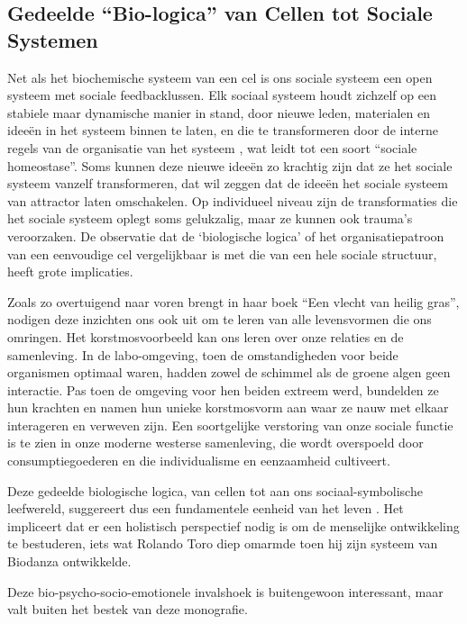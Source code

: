 \documentclass[
  11pt,
]{book}
\begin{document}
\hypertarget{gedeelde-bio-logica-van-cellen-tot-sociale-systemen}{%
\subsection{Gedeelde ``Bio-logica'' van Cellen tot Sociale Systemen}\label{gedeelde-bio-logica-van-cellen-tot-sociale-systemen}}

Net als het biochemische systeem van een cel is ons sociale systeem een open systeem met sociale feedbacklussen. Elk sociaal systeem houdt zichzelf op een stabiele maar dynamische manier in stand, door nieuwe leden, materialen en ideeën in het systeem binnen te laten, en die te transformeren door de interne regels van de organisatie van het systeem \citep{capraLuisi2014}, wat leidt tot een soort ``sociale homeostase''. Soms kunnen deze nieuwe ideeën zo krachtig zijn dat ze het sociale systeem vanzelf transformeren, dat wil zeggen dat de ideeën het sociale systeem van attractor laten omschakelen. Op individueel niveau zijn de transformaties die het sociale systeem oplegt soms gelukzalig, maar ze kunnen ook trauma's veroorzaken. De observatie dat de `biologische logica' of het organisatiepatroon van een eenvoudige cel vergelijkbaar is met die van een hele sociale structuur, heeft grote implicaties.

Zoals \citet{Kimmerer2013} zo overtuigend naar voren brengt in haar boek ``Een vlecht van heilig gras'', nodigen deze inzichten ons ook uit om te leren van alle levensvormen die ons omringen. Het korstmosvoorbeeld kan ons leren over onze relaties en de samenleving. In de labo-omgeving, toen de omstandigheden voor beide organismen optimaal waren, hadden zowel de schimmel als de groene algen geen interactie. Pas toen de omgeving voor hen beiden extreem werd, bundelden ze hun krachten en namen hun unieke korstmosvorm aan waar ze nauw met elkaar interageren en verweven zijn. Een soortgelijke verstoring van onze sociale functie is te zien in onze moderne westerse samenleving, die wordt overspoeld door consumptiegoederen en die individualisme en eenzaamheid cultiveert.

Deze gedeelde biologische logica, van cellen tot aan ons sociaal-symbolische leefwereld, suggereert dus een fundamentele eenheid van het leven \citep{capraLuisi2014}. Het impliceert dat er een holistisch perspectief nodig is om de menselijke ontwikkeling te bestuderen, iets wat Rolando Toro diep omarmde toen hij zijn systeem van Biodanza ontwikkelde.

Deze bio-psycho-socio-emotionele invalshoek is buitengewoon interessant, maar valt buiten het bestek van deze monografie.
\end{document}
